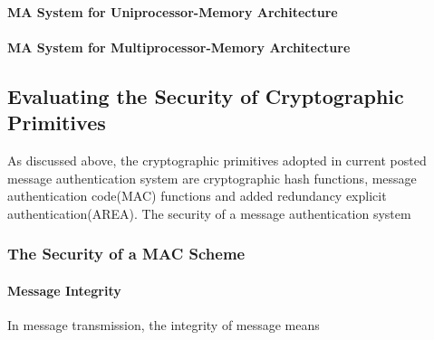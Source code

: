 \documentclass{article}
\begin{document}
\paragraph{MA System for Uniprocessor-Memory Architecture}
\paragraph{MA System for Multiprocessor-Memory Architecture}

\subsection{Evaluating the Security of Cryptographic Primitives}

As discussed above, the cryptographic primitives adopted in current posted message authentication system are cryptographic hash functions, message authentication code(MAC) functions and added redundancy explicit authentication(AREA). The security of a message authentication system 

\subsubsection{The Security of a MAC Scheme}
\paragraph{Message Integrity}
In message transmission, the integrity of message means 
\end{document}
